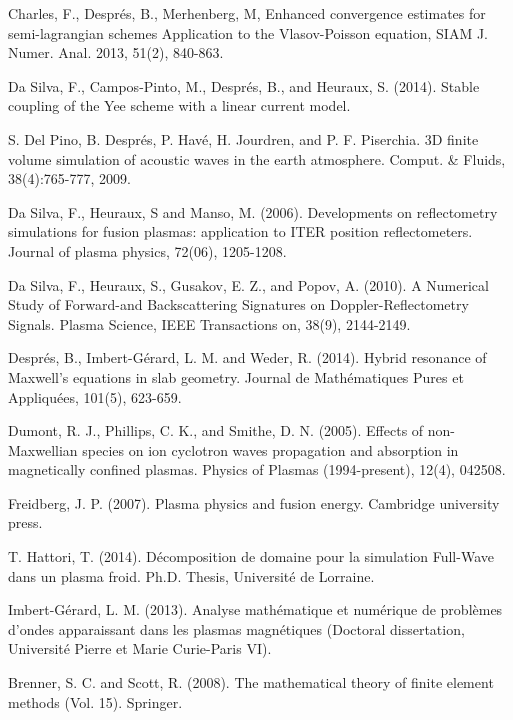 \documentclass[proc]{edpsmath}
\begin{document}
\begin{thebibliography}{99}
Charles, F., Despr\'es, B., Merhenberg, M, 
Enhanced convergence estimates for semi-lagrangian schemes Application to the Vlasov-Poisson equation, SIAM J. Numer. Anal. 2013, 51(2), 840-863.

 Da Silva, F., Campos-Pinto, M., Després, B., and Heuraux, S. (2014). Stable coupling of the Yee scheme with a linear current model.

S. Del Pino, B. Despr\'es, P. Hav\'e, H. Jourdren, and P. F. Piserchia. 3D finite
volume simulation of acoustic waves in the earth atmosphere.
Comput. \&
Fluids, 38(4):765-777, 2009.

 Da Silva, F., Heuraux, S and  Manso, M. (2006). Developments on reflectometry simulations for fusion plasmas: application to ITER position reflectometers. Journal of plasma physics, 72(06), 1205-1208.

Da Silva, F., Heuraux, S., Gusakov, E. Z., and Popov, A. (2010). A Numerical Study of Forward-and Backscattering Signatures on Doppler-Reflectometry Signals. Plasma Science, IEEE Transactions on, 38(9), 2144-2149.

 Després, B., Imbert-Gérard, L. M. and Weder, R. (2014). Hybrid resonance of Maxwell's equations in slab geometry. Journal de Mathématiques Pures et Appliquées, 101(5), 623-659.

 Dumont, R. J., Phillips, C. K., and Smithe, D. N. (2005). Effects of non-Maxwellian species on ion cyclotron waves propagation and absorption in magnetically confined plasmas. Physics of Plasmas (1994-present), 12(4), 042508.

 Freidberg, J. P. (2007). Plasma physics and fusion energy. Cambridge university press.


T. Hattori, T. (2014).
D\'ecomposition de domaine pour la simulation Full-Wave dans un plasma froid.
Ph.D. Thesis, Universit\'e de
Lorraine.

 Imbert-Gérard, L. M. (2013). Analyse mathématique et numérique de problèmes d'ondes apparaissant dans les plasmas magnétiques (Doctoral dissertation, Université Pierre et Marie Curie-Paris VI).

 Brenner, S. C. and Scott, R. (2008). The mathematical theory of finite element methods (Vol. 15). Springer.



\end{thebibliography}
\end{document}
